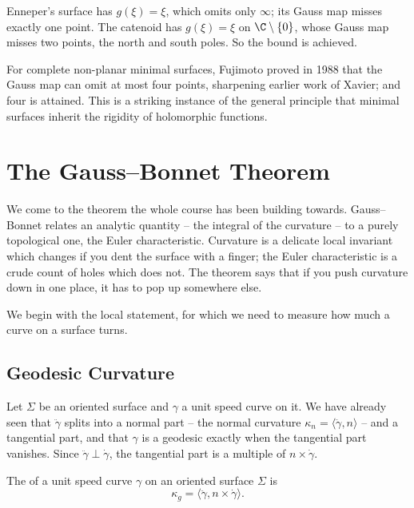 \begin{example}
    Enneper's surface has $g(\xi) = \xi$, which omits only $\infty$; its Gauss map misses exactly one point. The catenoid has $g(\xi) = \xi$ on $\C \setminus\{0\}$, whose Gauss map misses two points, the north and south poles. So the bound is achieved.
\end{example}

\begin{remark}
    For complete non-planar minimal surfaces, Fujimoto proved in 1988 that the Gauss map can omit at most four points, sharpening earlier work of Xavier; and four is attained. This is a striking instance of the general principle that minimal surfaces inherit the rigidity of holomorphic functions.
\end{remark}

\section{The Gauss--Bonnet Theorem}

We come to the theorem the whole course has been building towards. Gauss--Bonnet relates an analytic quantity -- the integral of the curvature -- to a purely topological one, the Euler characteristic. Curvature is a delicate local invariant which changes if you dent the surface with a finger; the Euler characteristic is a crude count of holes which does not. The theorem says that if you push curvature down in one place, it has to pop up somewhere else.

We begin with the local statement, for which we need to measure how much a curve on a surface turns.

\subsection{Geodesic Curvature}

Let $\Sigma$ be an oriented surface and $\gamma$ a unit speed curve on it. We have already seen that $\ddot\gamma$ splits into a normal part -- the normal curvature $\kappa_n = \langle \ddot\gamma, n\rangle$ -- and a tangential part, and that $\gamma$ is a geodesic exactly when the tangential part vanishes. Since $\ddot\gamma \perp \dot\gamma$, the tangential part is a multiple of $n \times \dot\gamma$.

\begin{definition}
    The  of a unit speed curve $\gamma$ on an oriented surface $\Sigma$ is
    $$
    \kappa_g = \langle \ddot\gamma, n\times\dot\gamma\rangle.
    $$
\end{definition}

